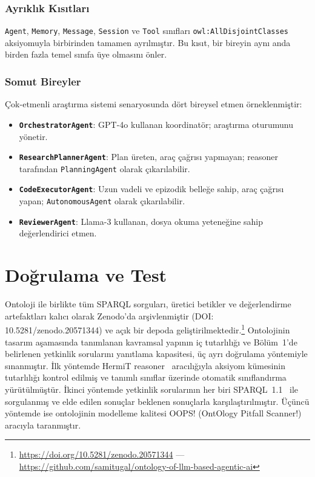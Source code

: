 \documentclass[10pt, a4paper, twocolumn]{article}
\begin{document}
\subsubsection*{Ayrıklık Kısıtları}

\texttt{Agent}, \texttt{Memory}, \texttt{Message}, \texttt{Session} ve \texttt{Tool} sınıfları \texttt{owl:AllDisjointClasses} aksiyomuyla birbirinden tamamen ayrılmıştır. Bu kısıt, bir bireyin aynı anda birden fazla temel sınıfa üye olmasını önler.

\subsubsection*{Somut Bireyler}

Çok-etmenli araştırma sistemi senaryosunda dört bireysel etmen örneklenmiştir:

\begin{itemize}
\item \textbf{\texttt{OrchestratorAgent}}: GPT-4o kullanan koordinatör; araştırma oturumunu yönetir.
\item \textbf{\texttt{ResearchPlannerAgent}}: Plan üreten, araç çağrısı yapmayan; reasoner tarafından \texttt{PlanningAgent} olarak çıkarılabilir.
\item \textbf{\texttt{CodeExecutorAgent}}: Uzun vadeli ve epizodik belleğe sahip, araç çağrısı yapan; \texttt{AutonomousAgent} olarak çıkarılabilir.
\item \textbf{\texttt{ReviewerAgent}}: Llama-3 kullanan, dosya okuma yeteneğine sahip değerlendirici etmen.
\end{itemize}

\section{Doğrulama ve Test}

Ontoloji ile birlikte tüm SPARQL sorguları, üretici betikler ve değerlendirme artefaktları kalıcı olarak Zenodo'da arşivlenmiştir (DOI: 10.5281/zenodo.20571344) ve açık bir depoda geliştirilmektedir.\footnote{\url{https://doi.org/10.5281/zenodo.20571344} --- \url{https://github.com/samitugal/ontology-of-llm-based-agentic-ai}} Ontolojinin tasarım aşamasında tanımlanan kavramsal yapının iç tutarlılığı ve Bölüm~1'de belirlenen yetkinlik sorularını yanıtlama kapasitesi, üç ayrı doğrulama yöntemiyle sınanmıştır. İlk yöntemde HermiT reasoner~\cite{glimm2014hermit} aracılığıyla aksiyom kümesinin tutarlılığı kontrol edilmiş ve tanımlı sınıflar üzerinde otomatik sınıflandırma yürütülmüştür. İkinci yöntemde yetkinlik sorularının her biri SPARQL~1.1~\cite{w3c2013sparql} ile sorgulanmış ve elde edilen sonuçlar beklenen sonuçlarla karşılaştırılmıştır. Üçüncü yöntemde ise ontolojinin modelleme kalitesi OOPS! (OntOlogy Pitfall Scanner!)~\cite{poveda2014oops} aracıyla taranmıştır.
\end{document}
